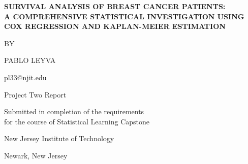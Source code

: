 \documentclass[12pt,a4paper]{article}
\begin{document}
\begin{titlepage}
\begin{center}

\vspace*{1.5in}

{\Large \textbf{SURVIVAL ANALYSIS OF BREAST CANCER PATIENTS: \\
A COMPREHENSIVE STATISTICAL INVESTIGATION USING COX REGRESSION AND KAPLAN-MEIER ESTIMATION}}

\vspace{1in}

{\large BY}

\vspace{0.2in}

{\large PABLO LEYVA}

\vspace{0.2in}

{\large pl33@njit.edu}

\vspace{1.2in}

{\large Project Two Report}

\vspace{0.2in}

{\large Submitted in completion of the requirements \\
for the course of Statistical Learning Capstone}

\vspace{1in}

{\large New Jersey Institute of Technology}

\vspace{0.2in}

{\large Newark, New Jersey}

\vspace{0.3in}

\end{center}
\end{titlepage}

\begin{abstract}
This study presents a comprehensive survival analysis of breast cancer patients using the Haberman dataset. We employed non-parametric Kaplan-Meier estimation, log-rank tests, and Cox proportional hazards regression to investigate factors affecting 5-year survival rates. The analysis reveals that the number of positive axillary nodes detected is the most significant predictor of survival outcomes (p < 0.001), with a hazard ratio of 2.854 per additional node. Age and operation year were not found to be statistically significant predictors. The overall 5-year survival rate was 73.5\%, with median survival time exceeding the observation period. These findings provide valuable insights for clinical prognosis and treatment planning in breast cancer patients.
\end{abstract}
\end{document}

